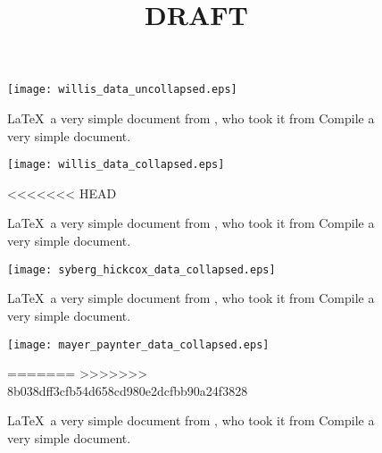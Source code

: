 \documentclass{article}
\begin{document}
\ifdraft
	\title{DRAFT}
	\maketitle
\else
\frontmatter
\fi

	\tableofcontents

\ifdraft
\else
\mainmatter
\fi

\pagebreak
\begin{figure}[htbp]
 \begin{center}
    \texttt{[image: willis\_data\_uncollapsed.eps]}
     \caption{\LaTeX\ a very simple document from \cite{Slater2012}, who took it from \cite{Willis1995} Compile a very simple document.}
     \label{fig:asdfasdfdf}
 \end{center}
\end{figure}

\begin{figure}[htbp]
 \begin{center}
    \texttt{[image: willis\_data\_collapsed.eps]}
     \caption{\LaTeX\ a very simple document from \cite{Slater2012}, who took it from \cite{Willis1995} Compile a very simple document.}
<<<<<<< HEAD
     \label{fig:asdfsdf}
 \end{center}
\end{figure}

\begin{figure}[htbp]
 \begin{center}
    \texttt{[image: syberg\_hickcox\_data\_collapsed.eps]}
     \caption{\LaTeX\ a very simple document from \cite{Slater2012}, who took it from \cite{Willis1995} Compile a very simple document.}
     \label{fig:asdfasdf}
 \end{center}
\end{figure}

\begin{figure}[htbp]
 \begin{center}
    \texttt{[image: mayer\_paynter\_data\_collapsed.eps]}
     \caption{\LaTeX\ a very simple document from \cite{Slater2012}, who took it from \cite{Willis1995} Compile a very simple document.}
     \label{fig:asdf}
=======
     \label{fig:sdfX}
>>>>>>> 8b038dff3cfb54d658cd980e2dcfbb90a24f3828
 \end{center}
\end{figure}

\pagebreak
\ifdraft
 	\printbibliography
\else
	\backmatter
\fi
\end{document}
